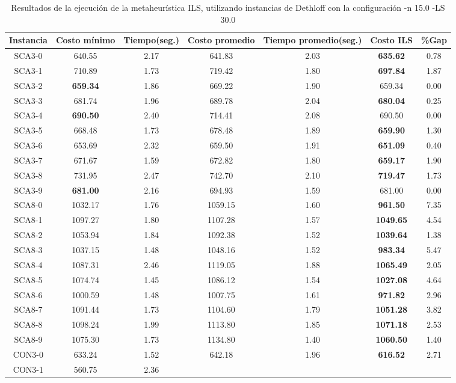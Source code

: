 \begin{table}[ht]
\caption{Resultados de la ejecución de la metaheurística ILS, utilizando instancias de Dethloff con la configuración -n 15.0 -LS 30.0}
\centering
\small
\begin{tabular}{c c c c c c c}
\hline\hline
Instancia & Costo mínimo & Tiempo(seg.) & Costo promedio & Tiempo promedio(seg.) & Costo ILS & \%Gap \\ [0.5ex]
\hline
SCA3-0 & 640.55 & 2.17 & 
641.83 & 2.03 & \bf{635.62} & 
0.78\\SCA3-1 & 710.89 & 1.73 & 
719.42 & 1.80 & \bf{697.84} & 
1.87\\SCA3-2 & \bf{659.34} & 1.86 & 
669.22 & 1.90 & 659.34 & 0.00\\
SCA3-3 & 681.74 & 1.96 & 
689.78 & 2.04 & \bf{680.04} & 
0.25\\SCA3-4 & \bf{690.50} & 2.40 & 
714.41 & 2.08 & 690.50 & 0.00\\
SCA3-5 & 668.48 & 1.73 & 
678.48 & 1.89 & \bf{659.90} & 
1.30\\SCA3-6 & 653.69 & 2.32 & 
659.50 & 1.91 & \bf{651.09} & 
0.40\\SCA3-7 & 671.67 & 1.59 & 
672.82 & 1.80 & \bf{659.17} & 
1.90\\SCA3-8 & 731.95 & 2.47 & 
742.70 & 2.10 & \bf{719.47} & 
1.73\\SCA3-9 & \bf{681.00} & 2.16 & 
694.93 & 1.59 & 681.00 & 0.00\\
SCA8-0 & 1032.17 & 1.76 & 
1059.15 & 1.60 & \bf{961.50} & 
7.35\\SCA8-1 & 1097.27 & 1.80 & 
1107.28 & 1.57 & \bf{1049.65} & 
4.54\\SCA8-2 & 1053.94 & 1.84 & 
1092.38 & 1.52 & \bf{1039.64} & 
1.38\\SCA8-3 & 1037.15 & 1.48 & 
1048.16 & 1.52 & \bf{983.34} & 
5.47\\SCA8-4 & 1087.31 & 2.46 & 
1119.05 & 1.88 & \bf{1065.49} & 
2.05\\SCA8-5 & 1074.74 & 1.45 & 
1086.12 & 1.54 & \bf{1027.08} & 
4.64\\SCA8-6 & 1000.59 & 1.48 & 
1007.75 & 1.61 & \bf{971.82} & 
2.96\\SCA8-7 & 1091.44 & 1.73 & 
1104.60 & 1.79 & \bf{1051.28} & 
3.82\\SCA8-8 & 1098.24 & 1.99 & 
1113.80 & 1.85 & \bf{1071.18} & 
2.53\\SCA8-9 & 1075.30 & 1.73 & 
1134.80 & 1.40 & \bf{1060.50} & 
1.40\\CON3-0 & 633.24 & 1.52 & 
642.18 & 1.96 & \bf{616.52} & 
2.71\\CON3-1 & 560.75 & 2.36 & 

\end{tabular}
\end{table}
